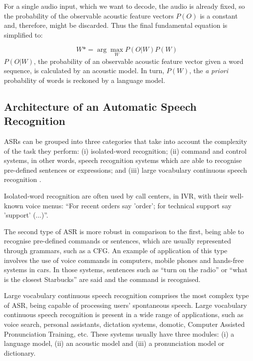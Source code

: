 For a single audio input, which we want to decode, the audio is already fixed, so the 
probability of the observable acoustic feature vectors $P(O)$ is a constant and, therefore, 
might be discarded. Thus the final fundamental equation is simplified to:

\begin{equation}
W*= \arg\max_{W}P(O|W)P(W)
\end{equation}
$P(O|W)$, the probability of an observable acoustic feature vector given a word sequence, is calculated by 
an acoustic model. In turn, $P(W)$, the \emph{a priori} probability of words is reckoned by a language model.

\subsection{Architecture of an Automatic Speech Recognition}

\ac{ASR}s can be grouped into three categories that take into account the complexity of the task they perform: (i) isolated-word recognition; (ii) command and control systems, in other words, speech recognition systems which are able to recognise pre-defined sentences or expressions; and (iii) large vocabulary continuous speech recognition \cite{Rabiner1997}.

Isolated-word recognition are often used by call centers, in \ac{IVR}, with their well-known voice menus: ``For recent orders say 'order'; for technical support say 'support' (...)''. 

The second type of \ac{ASR} is more robust in comparison to the first, being able to recognise pre-defined commands or sentences, which are usually represented through grammars, such as a \ac{CFG}. An example of application of this type involves the use of voice commands in computers, mobile phones and hands-free systems in cars. In those systems, sentences such as ``turn on the radio'' or ``what is the closest Starbucks'' are said and the command is recognised. 

Large vocabulary continuous speech recognition comprises the most complex type of ASR, being capable of processing users' spontaneous speech.
Large vocabulary continuous speech recognition is present in a wide range of applications, such as voice search, personal assistants, dictation systems, domotic, Computer Assisted Pronunciation Training, etc. These systems usually have three modules: (i) a language model, (ii) an acoustic model and (iii) a pronunciation model or dictionary.

